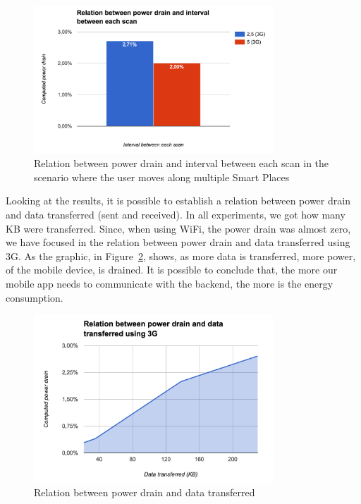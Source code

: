 \begin{figure}[!ht]
  \centering
    \includegraphics[width=0.8\textwidth, keepaspectratio]{images/results_battery_walking}
    \caption[Power drain when the user is moving]{Relation between power drain and interval between each scan in the scenario where the user moves along multiple Smart Places}
    \label{fig:results_battery_walking}
\end{figure}

Looking at the results, it is possible to establish a relation between power drain and data transferred (sent and received).
In all experiments, we got how many \gls{KB} were transferred.
Since, when using \gls{WiFi}, the power drain was almost zero, we have focused in the relation between power drain and data transferred using \gls{3G}.
As the graphic, in Figure~\ref{fig:results_battery_data}, shows, as more data is transferred, more power, of the mobile device, is drained.
It is possible to conclude that, the more our mobile app needs to communicate with the backend, the more is the energy consumption.

\begin{figure}[!ht]
  \centering
    \includegraphics[width=0.8\textwidth, keepaspectratio]{images/results_battery_data}
    \caption[Power drain vs Data transferred]{Relation between power drain and data transferred}
    \label{fig:results_battery_data}
\end{figure}
